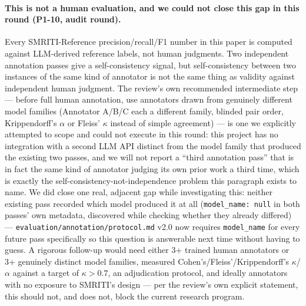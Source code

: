 \paragraph{This is not a human evaluation, and we could not close this
gap in this round (P1-10, audit round).} Every SMRITI-Reference
precision/recall/F1 number in this paper is computed against LLM-derived
reference labels, not human judgments. Two independent annotation passes
give a self-consistency signal, but self-consistency between two instances
of the same kind of annotator is not the same thing as validity against
independent human judgment. The review's own recommended intermediate
step --- before full human annotation, use annotators drawn from
genuinely different model families (Annotator A/B/C each a different
family, blinded pair order, Krippendorff's $\alpha$ or Fleiss' $\kappa$
instead of simple agreement) --- is one we explicitly attempted to scope
and could not execute in this round: this project has no integration
with a second LLM API distinct from the model family that produced the
existing two passes, and we will not report a ``third annotation pass''
that is in fact the same kind of annotator judging its own prior work a
third time, which is exactly the self-consistency-not-independence
problem this paragraph exists to name. We did close one real,
adjacent gap while investigating this: neither existing pass recorded
which model produced it at all (\texttt{model\_name: null} in both
passes' own metadata, discovered while checking whether they already
differed) --- \texttt{evaluation/annotation/protocol.md} v2.0 now
requires \texttt{model\_name} for every future pass specifically so this
question is answerable next time without having to guess. A rigorous
follow-up would need either 3+ trained human annotators or 3+ genuinely
distinct model families, measured Cohen's/Fleiss'/Krippendorff's
$\kappa$/$\alpha$ against a target of $\kappa > 0.7$, an adjudication
protocol, and ideally annotators with no exposure to SMRITI's design ---
per the review's own explicit statement, this should not, and does not,
block the current research program.

